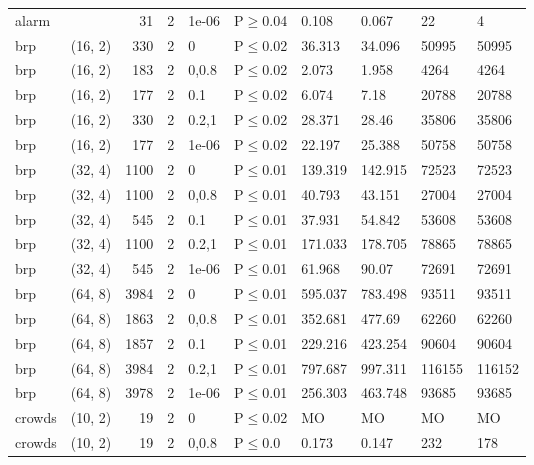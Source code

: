 \begin{longtable}{llrrllllll}
 alarm         &           &     	31 &   2 & 1e-06 & P$\geq$0.04  & 0.108   & 0.067    & 22     & 4      \\
 brp           & (16, 2)   &    	330 &   2 & 0     & P$\leq$0.02  & 36.313  & 34.096   & 50995  & 50995  \\
 brp           & (16, 2)   &    	183 &   2 & 0,0.8 & P$\leq$0.02  & 2.073   & 1.958    & 4264   & 4264   \\
 brp           & (16, 2)   &    	177 &   2 & 0.1   & P$\leq$0.02  & 6.074   & 7.18     & 20788  & 20788  \\
 brp           & (16, 2)   &    	330 &   2 & 0.2,1 & P$\leq$0.02  & 28.371  & 28.46    & 35806  & 35806  \\
 brp           & (16, 2)   &    	177 &   2 & 1e-06 & P$\leq$0.02  & 22.197  & 25.388   & 50758  & 50758  \\
 brp           & (32, 4)   &   	1100 &   2 & 0     & P$\leq$0.01  & 139.319 & 142.915  & 72523  & 72523  \\
 brp           & (32, 4)   &   	1100 &   2 & 0,0.8 & P$\leq$0.01  & 40.793  & 43.151   & 27004  & 27004  \\
 brp           & (32, 4)   &    	545 &   2 & 0.1   & P$\leq$0.01  & 37.931  & 54.842   & 53608  & 53608  \\
 brp           & (32, 4)   &   	1100 &   2 & 0.2,1 & P$\leq$0.01  & 171.033 & 178.705  & 78865  & 78865  \\
 brp           & (32, 4)   &    	545 &   2 & 1e-06 & P$\leq$0.01  & 61.968  & 90.07    & 72691  & 72691  \\
 brp           & (64, 8)   &   	3984 &   2 & 0     & P$\leq$0.01  & 595.037 & 783.498  & 93511  & 93511  \\
 brp           & (64, 8)   &   	1863 &   2 & 0,0.8 & P$\leq$0.01  & 352.681 & 477.69   & 62260  & 62260  \\
 brp           & (64, 8)   &   	1857 &   2 & 0.1   & P$\leq$0.01  & 229.216 & 423.254  & 90604  & 90604  \\
 brp           & (64, 8)   &   	3984 &   2 & 0.2,1 & P$\leq$0.01  & 797.687 & 997.311  & 116155 & 116152 \\
 brp           & (64, 8)   &   	3978 &   2 & 1e-06 & P$\leq$0.01  & 256.303 & 463.748  & 93685  & 93685  \\
 crowds        & (10, 2)   &     	19 &   2 & 0     & P$\leq$0.02  & MO      & MO       & MO     & MO     \\
 crowds        & (10, 2)   &     	19 &   2 & 0,0.8 & P$\leq$0.0   & 0.173   & 0.147    & 232    & 178    \\

\end{longtable}
